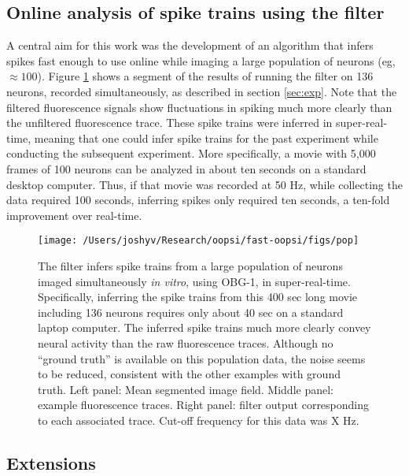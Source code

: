 \subsection{Online analysis of spike trains using the \foopsi filter}

A central aim for this work was the development of an algorithm that infers spikes fast enough to use online while imaging a large population of neurons (eg, $\approx 100$).  Figure \ref{fig:pop} shows a segment of the results of running the \foopsi filter on 136 neurons, recorded simultaneously, as described in section \ref{sec:exp}.  Note that the filtered fluorescence signals show fluctuations in spiking much more clearly than the unfiltered fluorescence trace. These spike trains were inferred in super-real-time, meaning that one could infer spike trains for the past experiment while conducting the subsequent experiment. More specifically, a movie with 5,000 frames of 100 neurons can be analyzed in about ten seconds on a standard desktop computer.  Thus, if that movie was recorded at 50 Hz, while collecting the data required 100 seconds, inferring spikes only required ten seconds, a ten-fold improvement over real-time.  


\begin{figure}[h!]
\begin{centering} 
\texttt{[image: /Users/joshyv/Research/oopsi/fast-oopsi/figs/pop]}
\end{centering}
\caption[\foopsi filter is robust and works online for populations of neurons]{The \foopsi filter infers spike trains from a large population of neurons imaged simultaneously \emph{in vitro}, using OBG-1, in super-real-time.  Specifically, inferring the spike trains from this 400 sec long movie including 136 neurons requires only about 40 sec on a standard laptop computer. The inferred spike trains much more clearly convey neural activity than the raw fluorescence traces.  Although no ``ground truth'' is available on this population data, the noise seems to be reduced, consistent with the other examples with ground truth.  Left panel: Mean segmented image field.  Middle panel: example fluorescence traces.  Right panel: \foopsi filter output corresponding to each associated trace. Cut-off frequency for this data was X Hz. } \label{fig:pop}
\end{figure}


\subsection{Extensions}


